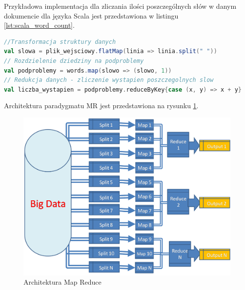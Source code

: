 \newline Przykładowa implementacja dla zliczania ilości poszczególnych słów w danym dokumencie dla języka Scala jest przedstawiona w listingu \ref{lst:scala_word_count}.
\begin{lstlisting}[language=scala, caption={Przykład "Word Count"},captionpos=b, label={lst:scala_word_count}]
//Transformacja struktury danych
val slowa = plik_wejsciowy.flatMap(linia => linia.split(" "))
// Rozdzielenie dziedziny na podproblemy
val podproblemy = words.map(slowo => (slowo, 1))
// Redukcja danych - zliczenie wystapien poszczegolnych slow
val liczba_wystapien = podproblemy.reduceByKey{case (x, y) => x + y}
\end{lstlisting}
Architektura paradygmatu MR jest przedstawiona na rysunku \ref{fig:@=map_reduce_schema}.\cite{map_reduce_figure} 
\begin{figure}
	\centering
	\includegraphics[scale=0.3]{map_reduce_flow.png}
	\caption{Architektura Map Reduce}
	\label{fig:@=map_reduce_schema}
\end{figure}
